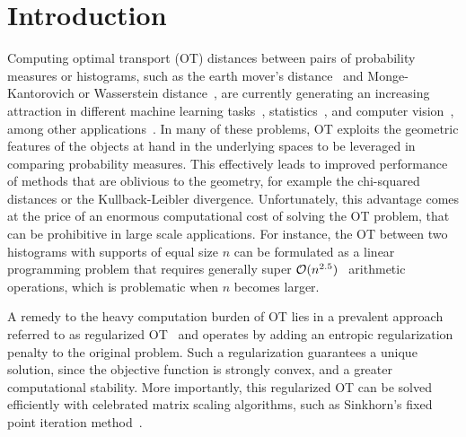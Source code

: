 
\section{Introduction} %
\label{sec:introduction}

Computing optimal transport (OT) distances between pairs of probability measures or histograms, such as the earth mover's distance~\citep{werman1985,Rubner2000} and Monge-Kantorovich or Wasserstein distance~\citep{villani09optimal}, are currently generating an increasing attraction in different machine learning tasks~\citep{pmlr-v32-solomon14,kusnerb2015,pmlr-v70-arjovsky17a,ho2017}, statistics~\citep{frogner2015nips,panaretos2016,ebert2017ConstructionON,bigot2017,flamary2018WDA}, and computer vision~\citep{bonnel2011,Rubner2000,solomon2015}, among other applications~\citep{klouri17,peyre2019COTnowpublisher}.
In many of these problems, OT exploits the geometric features of the objects at hand in the underlying spaces to be leveraged in comparing probability measures.
This effectively leads to improved performance of methods that are oblivious to the geometry, for example the chi-squared distances or the Kullback-Leibler divergence.
Unfortunately, this advantage comes at the price of an enormous computational cost of solving the OT problem, that can be prohibitive in large scale applications.
For instance, the OT between two histograms with supports of equal size $n$ can be formulated as a linear programming problem that requires generally super $\mathcal{O}(n^{2.5})$~\citep{leeSidford2013PathFI} arithmetic operations, which is problematic when $n$ becomes larger.

A remedy to the heavy computation burden of OT lies in a prevalent approach referred to as regularized OT~\citep{cuturinips13} and operates by adding an entropic regularization penalty to the original problem.  
Such a regularization guarantees a unique solution, since the objective function is strongly convex, and a greater computational stability.
More importantly, this regularized OT can be solved efficiently with celebrated matrix scaling algorithms, such as Sinkhorn's fixed point iteration method~\citep{sinkhorn1967,knight2008,kalantari2008}. 

